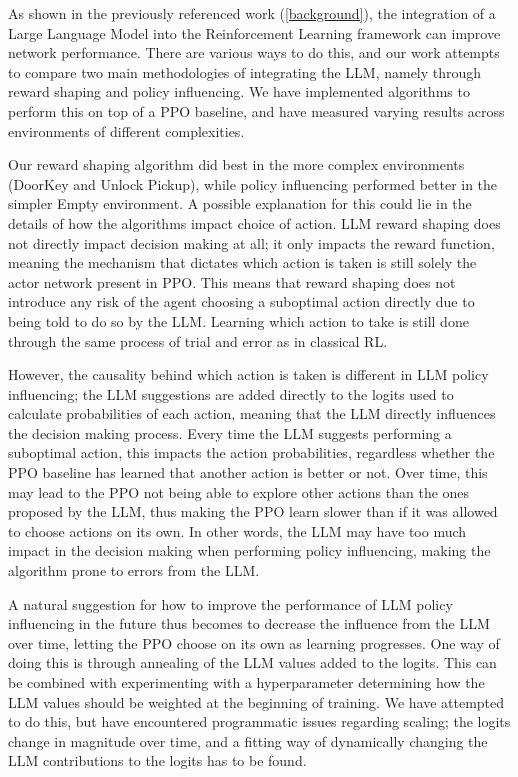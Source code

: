 \documentclass[conference]{IEEEtran}
\begin{document}

As shown in the previously referenced work (\ref{background}), the integration of a Large Language Model into the Reinforcement Learning framework can improve network performance. There are various ways to do this, and our work attempts to compare two main methodologies of integrating the LLM, namely through reward shaping and policy influencing. We have implemented algorithms to perform this on top of a PPO baseline, and have measured varying results across environments of different complexities.

Our reward shaping algorithm did best in the more complex environments (DoorKey and Unlock Pickup), while policy influencing performed better in the simpler Empty environment. A possible explanation for this could lie in the details of how the algorithms impact choice of action. LLM reward shaping does not directly impact decision making at all; it only impacts the reward function, meaning the mechanism that dictates which action is taken is still solely the actor network present in PPO. This means that reward shaping does not introduce any risk of the agent choosing a suboptimal action directly due to being told to do so by the LLM. Learning which action to take is still done through the same process of trial and error as in classical RL.

However, the causality behind which action is taken is different in LLM policy influencing; the LLM suggestions are added directly to the logits used to calculate probabilities of each action, meaning that the LLM directly influences the decision making process. Every time the LLM suggests performing a suboptimal action, this impacts the action probabilities, regardless whether the PPO baseline has learned that another action is better or not. Over time, this may lead to the PPO not being able to explore other actions than the ones proposed by the LLM, thus making the PPO learn slower than if it was allowed to choose actions on its own. In other words, the LLM may have too much impact in the decision making when performing policy influencing, making the algorithm prone to errors from the LLM.

A natural suggestion for how to improve the performance of LLM policy influencing in the future thus becomes to decrease the influence from the LLM over time, letting the PPO choose on its own as learning progresses. One way of doing this is through annealing of the LLM values added to the logits. This can be combined with experimenting with a hyperparameter determining how the LLM values should be weighted at the beginning of training. We have attempted to do this, but have encountered programmatic issues regarding scaling; the logits change in magnitude over time, and a fitting way of dynamically changing the LLM contributions to the logits has to be found.
\end{document}
